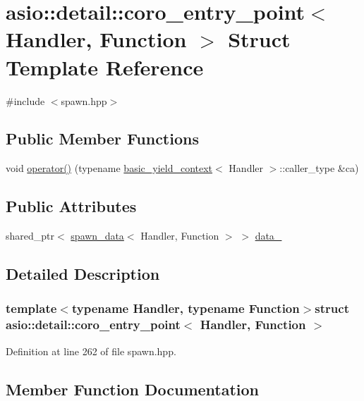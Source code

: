 \hypertarget{structasio_1_1detail_1_1coro__entry__point}{}\section{asio\+:\+:detail\+:\+:coro\+\_\+entry\+\_\+point$<$ Handler, Function $>$ Struct Template Reference}
\label{structasio_1_1detail_1_1coro__entry__point}


{\ttfamily \#include $<$spawn.\+hpp$>$}

\subsection*{Public Member Functions}
\begin{DoxyCompactItemize}
\item 
void \hyperlink{structasio_1_1detail_1_1coro__entry__point_a7bf557747cbbbc5f5224a3acbd7c68c1}{operator()} (typename \hyperlink{classasio_1_1basic__yield__context}{basic\+\_\+yield\+\_\+context}$<$ Handler $>$\+::caller\+\_\+type \&ca)
\end{DoxyCompactItemize}
\subsection*{Public Attributes}
\begin{DoxyCompactItemize}
\item 
shared\+\_\+ptr$<$ \hyperlink{structasio_1_1detail_1_1spawn__data}{spawn\+\_\+data}$<$ Handler, Function $>$ $>$ \hyperlink{structasio_1_1detail_1_1coro__entry__point_a2d0b5c4b298aadebbf347333af96c2c7}{data\+\_\+}
\end{DoxyCompactItemize}


\subsection{Detailed Description}
\subsubsection*{template$<$typename Handler, typename Function$>$struct asio\+::detail\+::coro\+\_\+entry\+\_\+point$<$ Handler, Function $>$}



Definition at line 262 of file spawn.\+hpp.



\subsection{Member Function Documentation}
\hypertarget{structasio_1_1detail_1_1coro__entry__point_a7bf557747cbbbc5f5224a3acbd7c68c1}{}
